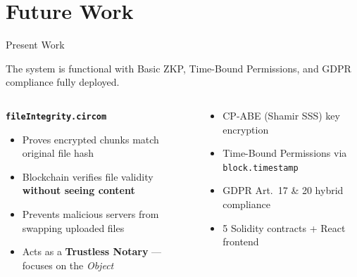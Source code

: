 \documentclass[aspectratio=169]{beamer}
\begin{document}
\section{Future Work}

\begin{frame}{Present Work}
\begin{tcolorbox}[greenbox, title=\textbf{Present Work --- Implemented}]
\small
The system is functional with Basic ZKP, Time-Bound Permissions,
and GDPR compliance fully deployed.
\end{tcolorbox}
\vspace{0.15cm}
\begin{columns}[t]
\begin{tcolorbox}[bluebox, title=\textbf{Basic ZKP: Data Integrity}]
\scriptsize
\textbf{\texttt{fileIntegrity.circom}}\\[3pt]
\begin{itemize}
  \item Proves encrypted chunks match original file hash
  \item Blockchain verifies file validity \textbf{without seeing content}
  \item Prevents malicious servers from swapping uploaded files
  \item Acts as a \textbf{Trustless Notary} --- focuses on the \textit{Object}
\end{itemize}
\end{tcolorbox}
\begin{tcolorbox}[greenbox, title=\textbf{Supporting Modules}]
\scriptsize
\begin{itemize}
  \item[\textcolor{successgreen!80!black}{\checkmark}] CP-ABE (Shamir SSS) key encryption
  \item[\textcolor{successgreen!80!black}{\checkmark}] Time-Bound Permissions via \texttt{block.timestamp}
  \item[\textcolor{successgreen!80!black}{\checkmark}] GDPR Art.\ 17 \& 20 hybrid compliance
  \item[\textcolor{successgreen!80!black}{\checkmark}] 5 Solidity contracts + React frontend
\end{itemize}
\end{tcolorbox}
\end{columns}
\end{frame}
\end{document}
